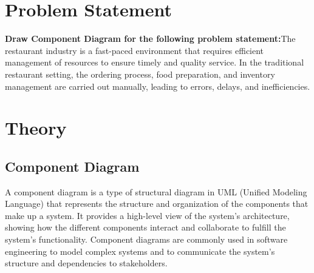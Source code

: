 \documentclass{article}
\begin{document}
\section{\textbf{Problem Statement}}
\textbf{Draw Component Diagram for the following problem statement:}The restaurant industry is a fast-paced environment that requires efficient management of resources to ensure timely and quality service. In the traditional restaurant setting, the ordering process, food preparation, and inventory management are carried out manually, leading to errors, delays, and inefficiencies.
\section{\textbf{Theory}}
\subsection{\textbf{Component Diagram}}
A component diagram is a type of structural diagram in UML (Unified Modeling Language) that represents the structure and organization of the components that make up a system. It provides a high-level view of the system's architecture, showing how the different components interact and collaborate to fulfill the system's functionality. Component diagrams are commonly used in software engineering to model complex systems and to communicate the system's structure and dependencies to stakeholders.
\end{document}
